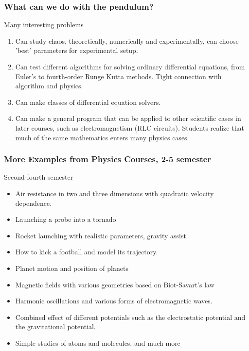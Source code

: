 \documentclass{beamer}
\begin{document}
\begin{frame}
\frametitle{What can we do with the pendulum?}

\begin{block}{Many interesting problems }

\begin{enumerate}
\item Can study chaos, theoretically, numerically and experimentally, can choose 'best' parameters  for experimental setup.

\item Can test different algorithms for solving ordinary differential equations, from Euler's to fourth-order Runge Kutta methods. Tight connection with algorithm and physics.

\item Can make classes of differential equation solvers.

\item Can make a general program that can be applied to other scientific cases in later courses, such as electromagnetism (RLC circuits).  Students realize that much of the same mathematics enters many physics cases.
\end{enumerate}

\noindent
\end{block}
\end{frame}

\begin{frame}
\frametitle{More Examples from Physics Courses, 2-5 semester}

\begin{block}{Second-fourth semester }

\begin{itemize}
\item Air resistance in two and three dimensions with quadratic velocity dependence.

\item Launching a probe into a tornado

\item Rocket launching with realistic parameters, gravity assist

\item How to kick a football and model its trajectory.

\item Planet motion and position of planets

\item Magnetic fields with various geometries based on Biot-Savart's law

\item Harmonic oscillations and various forms of electromagnetic waves.

\item Combined effect of different potentials such as the electrostatic potential and the gravitational potential.

\item Simple studies of atoms and molecules, and much more
\end{itemize}

\noindent
\end{block}
\end{frame}
\end{document}
